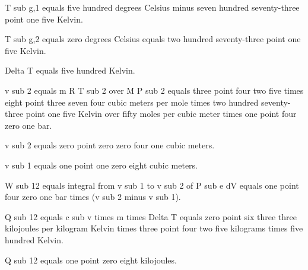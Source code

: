 T sub g,1 equals five hundred degrees Celsius minus seven hundred seventy-three point one five Kelvin.

T sub g,2 equals zero degrees Celsius equals two hundred seventy-three point one five Kelvin.

Delta T equals five hundred Kelvin.

v sub 2 equals m R T sub 2 over M P sub 2 equals three point four two five times eight point three seven four cubic meters per mole times two hundred seventy-three point one five Kelvin over fifty moles per cubic meter times one point four zero one bar.

v sub 2 equals zero point zero zero four one cubic meters.

v sub 1 equals one point one zero eight cubic meters.

W sub 12 equals integral from v sub 1 to v sub 2 of P sub e dV equals one point four zero one bar times (v sub 2 minus v sub 1).

Q sub 12 equals c sub v times m times Delta T equals zero point six three three kilojoules per kilogram Kelvin times three point four two five kilograms times five hundred Kelvin.

Q sub 12 equals one point zero eight kilojoules.
